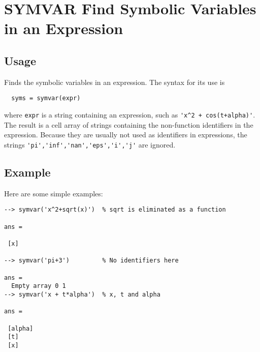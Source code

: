 \section{SYMVAR Find Symbolic Variables in an Expression}

\subsection{Usage}

Finds the symbolic variables in an expression.  The syntax for its
use is 
\begin{verbatim}
  syms = symvar(expr)
\end{verbatim}
where \verb|expr| is a string containing an expression, such as
\verb|'x^2 + cos(t+alpha)'|.  The result is a cell array of strings
containing the non-function identifiers in the expression.  Because
they are usually not used as identifiers in expressions, the strings
 \verb|'pi','inf','nan','eps','i','j'| are ignored.
\subsection{Example}

Here are some simple examples:
\begin{verbatim}
--> symvar('x^2+sqrt(x)')  % sqrt is eliminated as a function

ans = 

 [x] 

--> symvar('pi+3')         % No identifiers here

ans = 
  Empty array 0 1
--> symvar('x + t*alpha')  % x, t and alpha

ans = 

 [alpha] 
 [t] 
 [x] 
\end{verbatim}
